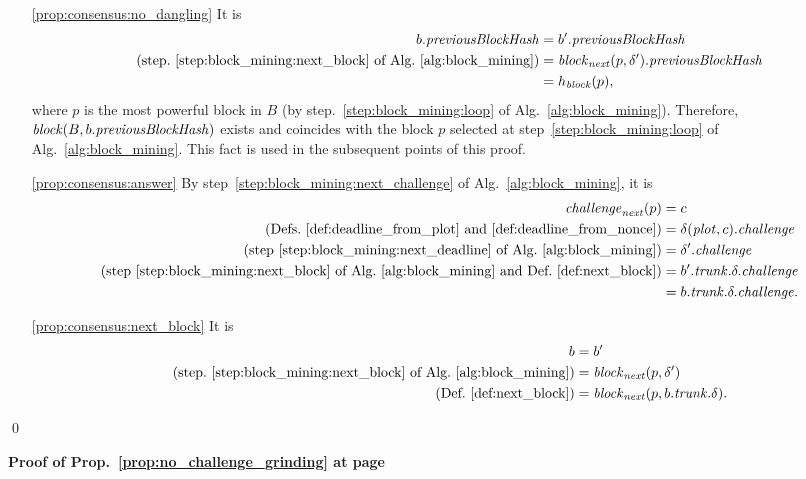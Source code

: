 \begin{itemize}
\begin{itemize}
    \item[\ref{prop:consensus:no_dangling}] It is
      \begin{align*}
        b.{\mathit{previousBlockHash}}&=b'.{\mathit{previousBlockHash}}\\
        \text{(step.~\ref{step:block_mining:next_block} of Alg.~\ref{alg:block_mining})}
        &={\mathit{block}}_{\mathit{next}}(p,\delta').{\mathit{previousBlockHash}}\\
        &=h_{\mathit{block}}(p),
      \end{align*}
      where $p$ is the most powerful block in $B$ (by step.~\ref{step:block_mining:loop}
      of Alg.~\ref{alg:block_mining}). Therefore, ${\mathit{block}}(B,b.{\mathit{previousBlockHash}})$ exists
      and coincides with the block $p$ selected at step~\ref{step:block_mining:loop}
      of Alg.~\ref{alg:block_mining}. This fact is used in the subsequent points of this proof.
    \item[\ref{prop:consensus:answer}] By step~\ref{step:block_mining:next_challenge}
      of Alg.~\ref{alg:block_mining}, it is
      \begin{align*}
        {\mathit{challenge}}_{\mathit{next}}(p)&=c\\
        \text{(Defs.~\ref{def:deadline_from_plot} and~\ref{def:deadline_from_nonce})}&=
        \delta({\mathit{plot}},c).{\mathit{challenge}}\\
        \text{(step~\ref{step:block_mining:next_deadline} of Alg.~\ref{alg:block_mining})}&=\delta'.{\mathit{challenge}}\\
        \text{(step~\ref{step:block_mining:next_block} of Alg.~\ref{alg:block_mining} and Def.~\ref{def:next_block})}&=b'.{\mathit{trunk}}.\delta.{\mathit{challenge}}\\
        &=b.{\mathit{trunk}}.\delta.{\mathit{challenge}}.
      \end{align*}
    \item[\ref{prop:consensus:next_block}] It is
      \begin{align*}
        b&=b'\\
        \text{(step.~\ref{step:block_mining:next_block} of Alg.~\ref{alg:block_mining})}
        &={\mathit{block}}_{\mathit{next}}(p,\delta')\\
        \text{(Def.~\ref{def:next_block})}&={\mathit{block}}_{\mathit{next}}(p,b.{\mathit{trunk}}.\delta).
      \end{align*}
    \end{itemize}
  \end{itemize}
  \qed

\noindent
\textbf{Proof of Prop.~\ref{prop:no_challenge_grinding} at page~\pageref{prop:no_challenge_grinding}}

